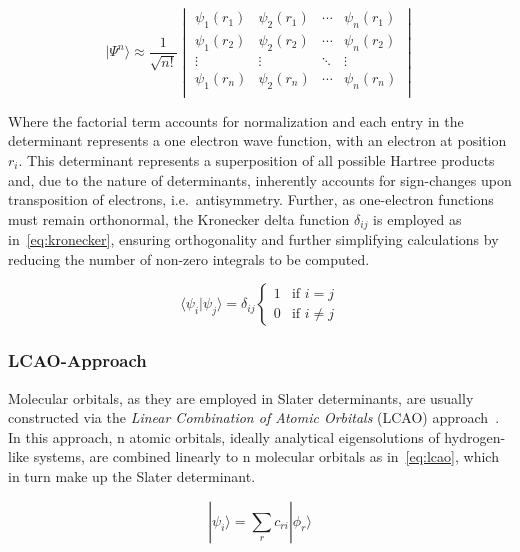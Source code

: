 \documentclass[12pt]{article}
\begin{document}
\begin{equation}
  |\Psi^{n}\rangle \approx \frac{1}{\sqrt{n!}}\begin{vmatrix}
    \psi_1(r_1) & \psi_2(r_1) & \cdots & \psi_n(r_1) \\
    \psi_1(r_2) & \psi_2(r_2) & \cdots & \psi_n(r_2) \\
    \vdots & \vdots & \ddots & \vdots \\
    \psi_1(r_n) & \psi_2(r_n) & \cdots & \psi_n(r_n) \\
  \end{vmatrix}
  \label{eq:slaterDeterminant}
\end{equation}

\bigskip

\noindent Where the factorial term accounts for normalization and each entry in the determinant represents a one electron wave function, with an electron at position $r_i$.
This determinant represents a superposition of all possible Hartree products and, due to the nature of determinants, inherently accounts for sign-changes upon transposition of electrons, i.e.~antisymmetry.
Further, as one-electron functions must remain orthonormal, the Kronecker delta function $\delta_{ij}$ is employed as in~\ref{eq:kronecker}, ensuring orthogonality and further simplifying calculations by reducing the number of non-zero integrals to be computed.



\begin{equation}
  \langle\psi_i|\psi_j\rangle = \delta_{ij}\begin{cases}
    1 & \text{if } i = j \\
    0 & \text{if } i \neq j
  \end{cases} 
  \label{eq:kronecker}
\end{equation}

\bigskip

\subsubsection{LCAO-Approach}
Molecular orbitals, as they are employed in Slater determinants, are usually constructed via the \textit{Linear Combination of Atomic Orbitals} (LCAO) approach~\cite{Slater1954}.
In this approach, n atomic orbitals, ideally analytical eigensolutions of hydrogen-like systems, are combined linearly to n molecular orbitals as in~\ref{eq:lcao}, which in turn make up the Slater determinant.

\begin{equation}
  |\psi_i\rangle = \sum_{r}^{}c_{r i}|\phi_{r}\rangle
  \label{eq:lcao}
\end{equation}
\end{document}
